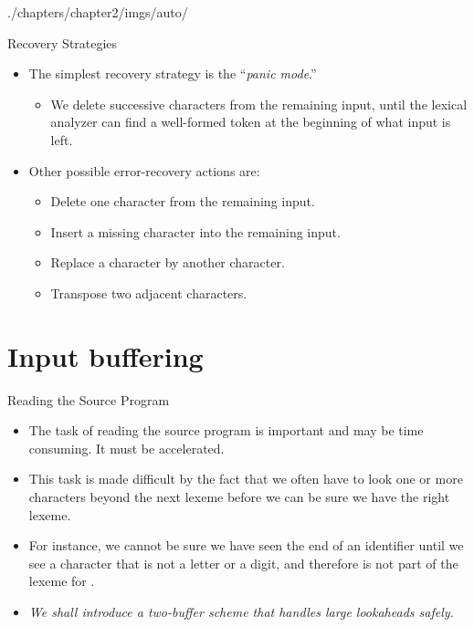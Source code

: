 \begin{graphicspathcontext}{{./chapters/chapter2/imgs/auto/}}
\begin{bibunit}[apalike]
\begin{frame}{Recovery Strategies}
	\begin{itemize}
	\item The simplest recovery strategy is the ``\emph{panic mode}.''
		\begin{itemize}
		\item We delete successive characters from the remaining input, until the lexical analyzer can find a well-formed token at the beginning of what input is left.
		\end{itemize}
	\vfill
	\item Other possible error-recovery actions are:
		\begin{itemize}
		\item Delete one character from the remaining input.
		\item Insert a missing character into the remaining input.
		\item Replace a character by another character.
		\item Transpose two adjacent characters.
		\end{itemize}
	\end{itemize}
\end{frame}

\section{Input buffering}

\tableofcontentslide[sectionstyle={show/shaded},subsectionstyle={show/show/hide},subsubsectionstyle={hide/hide/hide/hide}]

\begin{frame}{Reading the Source Program}
	\begin{itemize}
	\item The task of reading the source program is important and may be time consuming. It must be accelerated.
	\vfill
	\item This task is made difficult by the fact that we often have to look one or more characters beyond the next lexeme before we can be sure we have the right lexeme.
	\vfill
	\item For instance, we cannot be sure we have seen the end of an identifier until we see a character that is not a letter or a digit, and therefore is not part of the lexeme for .
	\vfill
	\item \emph{We shall introduce a two-buffer scheme that handles large lookaheads safely.}
	\end{itemize}
\end{frame}


\end{bibunit}
\end{graphicspathcontext}
